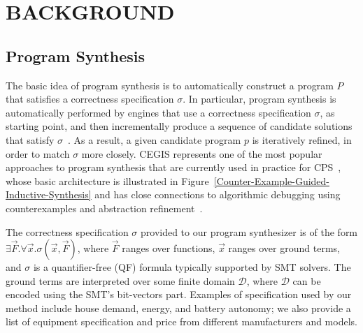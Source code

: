 \documentclass[10pt,conference]{IEEEtran}
\begin{document}
\section{BACKGROUND}
\label{sec:AutomatedVerification}
%
\subsection{Program Synthesis}
\label{sec:ProgramSynthesis}
%
The basic idea of program synthesis is to automatically construct a program $P$ that satisfies a correctness specification $\sigma$. In particular, program synthesis is automatically performed by engines that use a correctness specification $\sigma$, as starting point, and then incrementally produce a sequence of candidate solutions that satisfy $\sigma$~\cite{Abateetal2017}. As a result, a given candidate program $p$ is iteratively refined, in order to match $\sigma$ more closely. CEGIS represents one of the most popular approaches to program synthesis that are currently used in practice for CPS~\cite{Abateetal2017}, whose basic architecture is illustrated in Figure~\ref{Counter-Example-Guided-Inductive-Synthesis} and has close connections to algorithmic debugging using counterexamples and abstraction refinement~\cite{Alur13}. 

The correctness specification $\sigma$ provided to our program synthesizer is of the form $\exists \vec{F} .  \forall \vec{x}.  \sigma(\vec{x}, \vec{F})$, where $\vec{F}$ ranges over functions, $\vec{x}$ ranges over ground terms, and $\sigma$ is a quantifier-free (QF) formula typically supported by SMT solvers. The ground terms are interpreted over some finite domain $\mathcal{D}$, where $\mathcal{D}$ can be encoded using the SMT's bit-vectors part. Examples of specification used by our method include house demand, energy, and battery autonomy; we also provide a list of equipment specification and price from different manufacturers and models.
\end{document}
